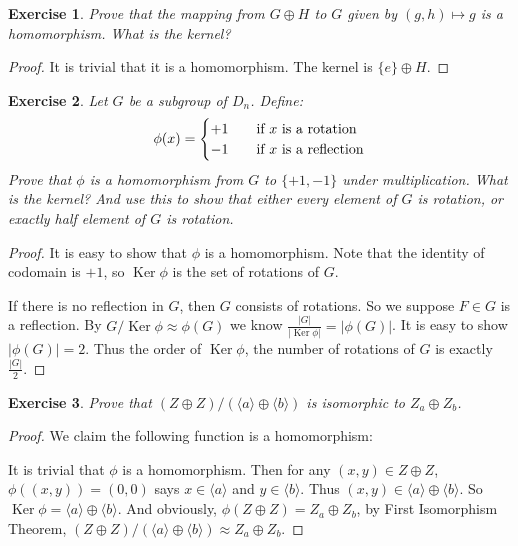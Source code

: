 \documentclass[14pt]{extarticle}
\newtheorem{exercise}{Exercise}[section]
\newcommand{\1}{\{ e \}}
\DeclareMathOperator{\Ker}{Ker}
\DeclareMathOperator{\modu}{mod}
\begin{document}
\begin{exercise}
  Prove that the mapping from $G \oplus H$ to $G$ 
  given by $(g , h) \mapsto g$ is a homomorphism.
  What is the kernel?
\end{exercise}
\begin{proof}
  It is trivial that it is a homomorphism.
  The kernel is $\{ e \} \oplus H$.
\end{proof}

\begin{exercise}
  Let $G$ be a subgroup of $D_n$. Define:
  \[
    \phi(x) = \begin{cases}
      +1 & \quad \textnormal{if } x \textnormal{ is a rotation} \\
      -1 & \quad \textnormal{if } x \textnormal{ is a reflection}
    \end{cases}
  \]
  Prove that $\phi$ is a homomorphism from $G$ to $\{ +1 , -1 \}$ under multiplication.
  What is the kernel? And use this to show that either 
  every element of $G$ is rotation, or
  exactly half element of $G$ is rotation.
\end{exercise}
\begin{proof}
  It is easy to show that $\phi$ is a homomorphism.
  Note that the identity of codomain is $+1$, 
  so $\Ker \phi$ is the set of rotations of $G$.

  If there is no reflection in $G$, then $G$ consists of rotations.
  So we suppose $F \in G$ is a reflection.
  By $G/\Ker\phi \approx \phi(G)$
  we know $\displaystyle \frac{|G|}{|\Ker \phi|} = |\phi(G)|$.
  It is easy to show $|\phi(G)| = 2$.
  Thus the order of $\Ker \phi$, the number of rotations of $G$ is exactly $\displaystyle \frac{|G|}{2}$.
\end{proof}

\begin{exercise}
  Prove that $(Z \oplus Z)/(\langle a \rangle \oplus \langle b \rangle)$
  is isomorphic to $Z_a \oplus Z_b$.
\end{exercise}
\begin{proof}
  We claim the following function is a homomorphism:
  \begin{center}
    \boxed{\phi((x , y)) = (x \ \modu \ a , y \ \modu \ b) : Z \oplus Z \rightarrow Z_a \oplus Z_b}
  \end{center}
  It is trivial that $\phi$ is a homomorphism.
  Then for any $(x , y) \in Z \oplus Z$, $\phi((x , y)) = (0 , 0)$
  says $x \in \langle a \rangle$ and $y \in \langle b \rangle$.
  Thus $(x , y) \in \langle a \rangle \oplus \langle b \rangle$.
  So $\Ker \phi = \langle a \rangle \oplus \langle b \rangle$.
  And obviously, $\phi(Z \oplus Z) = Z_a \oplus Z_b$, 
  by First Isomorphism Theorem,
  $(Z \oplus Z)/(\langle a \rangle \oplus \langle b \rangle) \approx Z_a \oplus Z_b$.
\end{proof}
\end{document}

